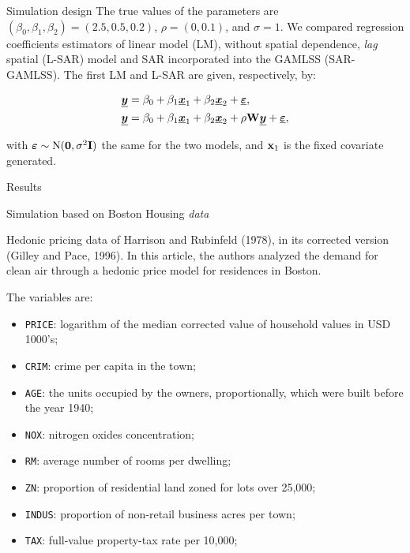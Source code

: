\documentclass[10pt,unknownkeysallowed]{beamer}
\newcommand{\mat}[1]{\mbox{\boldmath{$#1$}}}
\begin{document}
\begin{frame}{Simulation design}
 The true values of the parameters are  $(\beta_0,\beta_1,\beta_2)=(2.5,0.5,0.2)$, $\rho=(0,0.1)$, and $\sigma=1$. 
 We compared regression coefficients estimators of linear model (LM), without spatial dependence, \textit{lag} spatial (L-SAR) model and SAR incorporated into the GAMLSS (SAR-GAMLSS). The first LM and L-SAR are given, respectively, by:

     \begin{align*}
      \underline{\mat{y}}&= \beta_0+\beta_1\underline{\mat{x}}_1+\beta_2\underline{\mat{x}}_2
    + \underline{\mat{\varepsilon}}, \nonumber \\
    \underline{\mat{y}}&= \beta_0+ \beta_1\underline{\mat{x}}_1+\beta_2\underline{\mat{x}}_2+
    \rho \textbf{\textrm{W}} \underline{\mat{y}}+\underline{\mat{\varepsilon}}, \nonumber \\
     \end{align*}

 \noindent with $\mat{\varepsilon}\sim \textrm{N}(\mat{0},\sigma^2\textbf{\textrm{I}})$ the same for the two models, and $\textbf{\textrm{x}}_1$ is the fixed  covariate generated.
\end{frame}


\begin{frame}{Results}
    
\end{frame}

\begin{frame}{Simulation based on Boston Housing \textit{data}}

Hedonic pricing data of Harrison and Rubinfeld (1978), in its corrected version (Gilley and Pace, 1996). In this article, the authors analyzed the demand for clean air through a hedonic price model for residences in Boston.

The variables are:
\begin{itemize}
    \item \texttt{PRICE}: logarithm of the median corrected value of household values in USD 1000's;
    \item \texttt{CRIM}: crime per capita in the town;
    \item \texttt{AGE}: the units occupied by the owners, proportionally, which were built before the year 1940;
    \item \texttt{NOX}: nitrogen oxides concentration;
    \item \texttt{RM}: average number of rooms per dwelling;
    \item  \texttt{ZN}: proportion of residential land zoned for lots over 25,000;
    \item  \texttt{INDUS}: proportion of non-retail business acres per town;
    \item \texttt{TAX}: full-value property-tax rate per 10,000;
    \end{itemize}
    \end{frame}
    
\end{document}
